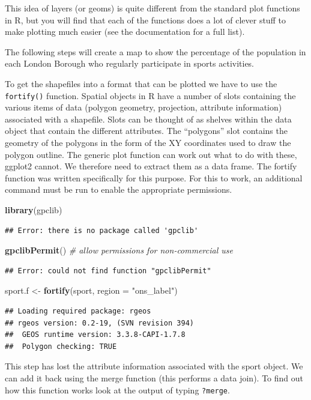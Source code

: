 \documentclass[]{article}
\newenvironment{Shaded}{}{}
\newcommand{\KeywordTok}[1]{\textcolor[rgb]{0.00,0.44,0.13}{\textbf{{#1}}}}
\newcommand{\DataTypeTok}[1]{\textcolor[rgb]{0.56,0.13,0.00}{{#1}}}
\newcommand{\StringTok}[1]{\textcolor[rgb]{0.25,0.44,0.63}{{#1}}}
\newcommand{\CommentTok}[1]{\textcolor[rgb]{0.38,0.63,0.69}{\textit{{#1}}}}
\newcommand{\NormalTok}[1]{{#1}}
\begin{document}
This idea of layers (or geoms) is quite different from the standard plot
functions in R, but you will find that each of the functions does a lot
of clever stuff to make plotting much easier (see the documentation for
a full list).

The following steps will create a map to show the percentage of the
population in each London Borough who regularly participate in sports
activities.

To get the shapefiles into a format that can be plotted we have to use
the \texttt{fortify()} function. Spatial objects in R have a number of
slots containing the various items of data (polygon geometry,
projection, attribute information) associated with a shapefile. Slots
can be thought of as shelves within the data object that contain the
different attributes. The ``polygons'' slot contains the geometry of the
polygons in the form of the XY coordinates used to draw the polygon
outline. The generic plot function can work out what to do with these,
ggplot2 cannot. We therefore need to extract them as a data frame. The
fortify function was written specifically for this purpose. For this to
work, an additional command must be run to enable the appropriate
permissions.

\begin{Shaded}
\begin{Highlighting}[]
\KeywordTok{library}\NormalTok{(gpclib)}
\end{Highlighting}
\end{Shaded}
\begin{verbatim}
## Error: there is no package called 'gpclib'
\end{verbatim}
\begin{Shaded}
\begin{Highlighting}[]
\KeywordTok{gpclibPermit}\NormalTok{()  }\CommentTok{# allow permissions for non-commercial use}
\end{Highlighting}
\end{Shaded}
\begin{verbatim}
## Error: could not find function "gpclibPermit"
\end{verbatim}
\begin{Shaded}
\begin{Highlighting}[]
\NormalTok{sport.f <- }\KeywordTok{fortify}\NormalTok{(sport, }\DataTypeTok{region =} \StringTok{"ons_label"}\NormalTok{)}
\end{Highlighting}
\end{Shaded}
\begin{verbatim}
## Loading required package: rgeos
## rgeos version: 0.2-19, (SVN revision 394)
##  GEOS runtime version: 3.3.8-CAPI-1.7.8 
##  Polygon checking: TRUE
\end{verbatim}
This step has lost the attribute information associated with the sport
object. We can add it back using the merge function (this performs a
data join). To find out how this function works look at the output of
typing \texttt{?merge}.
\end{document}
